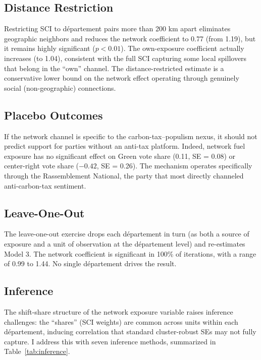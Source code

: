 \documentclass[12pt]{article}
\newcommand{\rn}{Rassemblement National}
\newcommand{\dept}{d\'{e}partement}
\begin{document}
\subsection{Distance Restriction}

Restricting SCI to \dept{} pairs more than 200 km apart eliminates geographic neighbors and reduces the network coefficient to 0.77 (from 1.19), but it remains highly significant ($p < 0.01$). The own-exposure coefficient actually increases (to 1.04), consistent with the full SCI capturing some local spillovers that belong in the ``own'' channel. The distance-restricted estimate is a conservative lower bound on the network effect operating through genuinely social (non-geographic) connections.

\subsection{Placebo Outcomes}

If the network channel is specific to the carbon-tax--populism nexus, it should not predict support for parties without an anti-tax platform. Indeed, network fuel exposure has no significant effect on Green vote share (0.11, SE = 0.08) or center-right vote share ($-0.42$, SE = 0.26). The mechanism operates specifically through the \rn{}, the party that most directly channeled anti-carbon-tax sentiment.

\subsection{Leave-One-Out}

The leave-one-out exercise drops each \dept{} in turn (as both a source of exposure and a unit of observation at the \dept{} level) and re-estimates Model 3. The network coefficient is significant in 100\% of iterations, with a range of 0.99 to 1.44. No single \dept{} drives the result.

\subsection{Inference}
\label{sec:inference}

The shift-share structure of the network exposure variable raises inference challenges: the ``shares'' (SCI weights) are common across units within each \dept{}, inducing correlation that standard cluster-robust SEs may not fully capture. I address this with seven inference methods, summarized in Table~\ref{tab:inference}.
\end{document}
